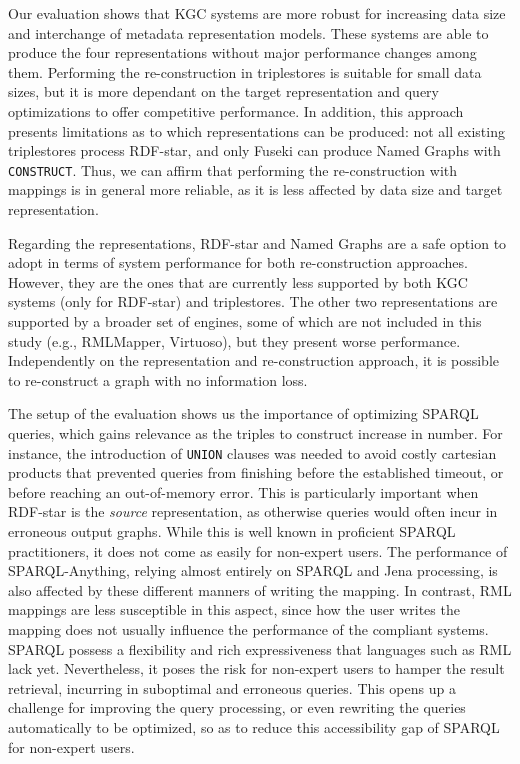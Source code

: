 Our evaluation shows that KGC systems are more robust for increasing data size and interchange of metadata representation models. These systems are able to produce the four representations without major performance changes among them. 
Performing the re-construction in triplestores is suitable for small data sizes, but it is more dependant on the target representation and query optimizations to offer competitive performance. 
In addition, this approach presents limitations as to which representations can be produced:
not all existing triplestores process RDF-star, and only Fuseki can produce Named Graphs with \texttt{CONSTRUCT}.
Thus, we can affirm that performing the re-construction with mappings is in general more reliable, as it is less affected by data size and target representation. 

Regarding the representations, RDF-star and Named Graphs are a safe option to adopt in terms of system performance for both re-construction approaches. However, they are the ones that are currently less supported by both KGC systems (only for RDF-star) and triplestores. The other two representations are supported by a broader set of engines, some of which are not included in this study (e.g., RMLMapper, Virtuoso), but they present worse performance. Independently on the representation and re-construction approach, it is possible to re-construct a graph with no information loss. 


The setup of the evaluation shows us the importance of optimizing SPARQL queries, which gains relevance as the triples to construct increase in number. For instance, the introduction of \texttt{UNION} clauses was needed to avoid costly cartesian products that prevented queries from finishing before the established timeout, or before reaching an out-of-memory error. This is particularly important when RDF-star is the \textit{source} representation, as otherwise queries would often incur in erroneous output graphs. While this is well known in proficient SPARQL practitioners, it does not come as easily for non-expert users. The performance of SPARQL-Anything, relying almost entirely on SPARQL and Jena processing, is also affected by these different manners of writing the mapping. In contrast, RML mappings are less susceptible in this aspect, since how the user writes the mapping does not usually influence the performance of the compliant systems. SPARQL possess a flexibility and rich expressiveness that languages such as RML lack yet. Nevertheless, it poses the risk for non-expert users to hamper the result retrieval, incurring in suboptimal and erroneous queries. This opens up a challenge for improving the query processing, or even rewriting the queries automatically to be optimized, so as to reduce this accessibility gap of SPARQL for non-expert users.

